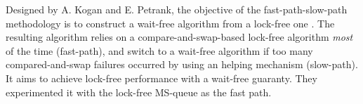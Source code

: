  Designed by A. Kogan and E. Petrank, the objective of
the fast-path-slow-path methodology is to construct a wait-free algorithm from a
lock-free one \cite{Kogan:2012:MCF:2370036.2145835}. The resulting algorithm
relies on a compare-and-swap-based lock-free algorithm \textit{most} of the
time (fast-path), and switch to a wait-free algorithm if too many
compared-and-swap failures occurred by using an helping mechanism
(slow-path). It aims to achieve lock-free performance with a wait-free guaranty.
They experimented it with the lock-free MS-queue as the fast path.
